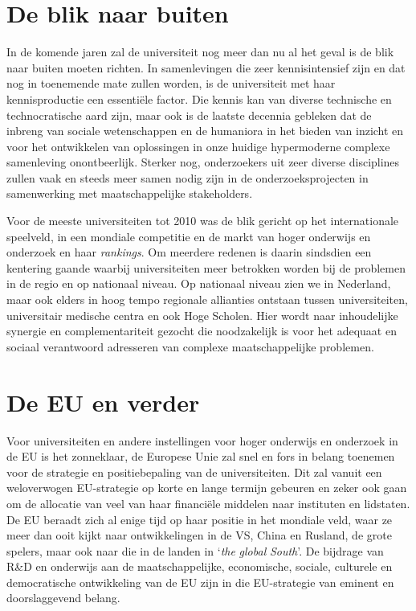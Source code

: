 \documentclass[smallauthor, chapterhaspagenum, nochapterinheader, pagenuminheader,  bigchapnum,medium2, tocpages, garamond, titleinheader]{jote-book}
\begin{document}
	\section{De blik naar buiten}



	In de komende jaren zal de universiteit nog meer dan nu al het geval is de blik naar buiten moeten richten. In samenlevingen die zeer kennisintensief zijn en dat nog in toenemende mate zullen worden, is de universiteit met haar kennisproductie een essentiële factor. Die kennis kan van diverse technische en technocratische aard zijn, maar ook is de laatste decennia gebleken dat de inbreng van sociale wetenschappen en de humaniora in het bieden van inzicht en voor het ontwikkelen van oplossingen in onze huidige hypermoderne complexe samenleving onontbeerlijk. Sterker nog, onderzoekers uit zeer diverse disciplines zullen vaak en steeds meer samen nodig zijn in de onderzoeksprojecten in samenwerking met maatschappelijke stakeholders.



	Voor de meeste universiteiten tot 2010 was de blik gericht op het internationale speelveld, in een mondiale competitie en de markt van hoger onderwijs en onderzoek en haar \emph{rankings}. Om meerdere redenen is daarin sindsdien een kentering gaande waarbij universiteiten meer betrokken worden bij de problemen in de regio en op nationaal niveau. Op nationaal niveau zien we in Nederland, maar ook elders in hoog tempo regionale allianties ontstaan tussen universiteiten, universitair medische centra en ook Hoge Scholen. Hier wordt naar inhoudelijke synergie en complementariteit gezocht die noodzakelijk is voor het adequaat en sociaal verantwoord adresseren van complexe maatschappelijke problemen.\textbf{ }



	\section{De EU en verder }



	Voor universiteiten en andere instellingen voor hoger onderwijs en onderzoek in de EU is het zonneklaar, de Europese Unie zal snel en fors in belang toenemen voor de strategie en positiebepaling van de universiteiten. Dit zal vanuit een weloverwogen EU-strategie op korte en lange termijn gebeuren en zeker ook gaan om de allocatie van veel van haar financiële middelen naar instituten en lidstaten. De EU beraadt zich al enige tijd op haar positie in het mondiale veld, waar ze meer dan ooit kijkt naar ontwikkelingen in de VS, China en Rusland, de grote spelers, maar ook naar die in de landen in ‘\emph{the}\emph{ }\emph{global}\emph{ South}'. De bijdrage van R\&D en onderwijs aan de maatschappelijke, economische, sociale, culturele en democratische ontwikkeling van de EU zijn in die EU-strategie van eminent en doorslaggevend belang.
\end{document}
